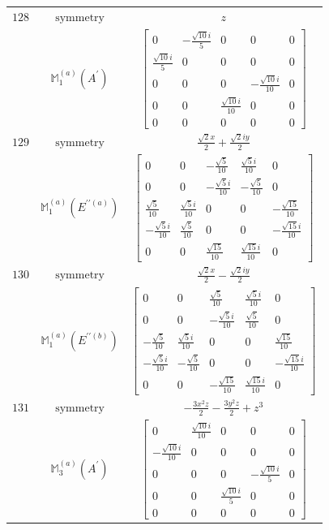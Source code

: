 \documentclass[fleqn,8pt,landscape]{jsarticle}
\begin{document}
\begin{longtable}{ccc}
$ 128 $ & $ \text{symmetry} $ & $ z $ \\
$  $ & $ \mathbb{M}_{1}^{(a)}(A^{\prime}) $ & $ \begin{bmatrix} 0 & - \frac{\sqrt{10} i}{5} & 0 & 0 & 0 \\ \frac{\sqrt{10} i}{5} & 0 & 0 & 0 & 0 \\ 0 & 0 & 0 & - \frac{\sqrt{10} i}{10} & 0 \\ 0 & 0 & \frac{\sqrt{10} i}{10} & 0 & 0 \\ 0 & 0 & 0 & 0 & 0 \end{bmatrix} $ \\ \hline
$ 129 $ & $ \text{symmetry} $ & $ \frac{\sqrt{2} x}{2} + \frac{\sqrt{2} i y}{2} $ \\
$  $ & $ \mathbb{M}_{1}^{(a)}(E^{\prime\prime(a)}) $ & $ \begin{bmatrix} 0 & 0 & - \frac{\sqrt{5}}{10} & \frac{\sqrt{5} i}{10} & 0 \\ 0 & 0 & - \frac{\sqrt{5} i}{10} & - \frac{\sqrt{5}}{10} & 0 \\ \frac{\sqrt{5}}{10} & \frac{\sqrt{5} i}{10} & 0 & 0 & - \frac{\sqrt{15}}{10} \\ - \frac{\sqrt{5} i}{10} & \frac{\sqrt{5}}{10} & 0 & 0 & - \frac{\sqrt{15} i}{10} \\ 0 & 0 & \frac{\sqrt{15}}{10} & \frac{\sqrt{15} i}{10} & 0 \end{bmatrix} $ \\ \hline
$ 130 $ & $ \text{symmetry} $ & $ \frac{\sqrt{2} x}{2} - \frac{\sqrt{2} i y}{2} $ \\
$  $ & $ \mathbb{M}_{1}^{(a)}(E^{\prime\prime(b)}) $ & $ \begin{bmatrix} 0 & 0 & \frac{\sqrt{5}}{10} & \frac{\sqrt{5} i}{10} & 0 \\ 0 & 0 & - \frac{\sqrt{5} i}{10} & \frac{\sqrt{5}}{10} & 0 \\ - \frac{\sqrt{5}}{10} & \frac{\sqrt{5} i}{10} & 0 & 0 & \frac{\sqrt{15}}{10} \\ - \frac{\sqrt{5} i}{10} & - \frac{\sqrt{5}}{10} & 0 & 0 & - \frac{\sqrt{15} i}{10} \\ 0 & 0 & - \frac{\sqrt{15}}{10} & \frac{\sqrt{15} i}{10} & 0 \end{bmatrix} $ \\ \hline
$ 131 $ & $ \text{symmetry} $ & $ - \frac{3 x^{2} z}{2} - \frac{3 y^{2} z}{2} + z^{3} $ \\
$  $ & $ \mathbb{M}_{3}^{(a)}(A^{\prime}) $ & $ \begin{bmatrix} 0 & \frac{\sqrt{10} i}{10} & 0 & 0 & 0 \\ - \frac{\sqrt{10} i}{10} & 0 & 0 & 0 & 0 \\ 0 & 0 & 0 & - \frac{\sqrt{10} i}{5} & 0 \\ 0 & 0 & \frac{\sqrt{10} i}{5} & 0 & 0 \\ 0 & 0 & 0 & 0 & 0 \end{bmatrix} $ \\ \hline

\end{longtable}
\end{document}
